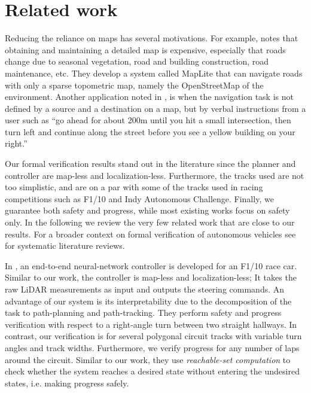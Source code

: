 \section{Related work}
\label{sec:relwork}
Reducing the reliance on maps has several motivations.
%
For example, \cite{Ort.2019} notes that 
obtaining and maintaining a detailed map is expensive, especially that roads change due to seasonal vegetation, road and building construction, road maintenance, etc.
%
They develop a system called MapLite that can navigate roads with only a sparse topometric map, namely the OpenStreetMap of the environment.
%
Another application noted in \cite{Vasudevan.2021}, \cite{Deruyttere.2019} is when the navigation task is not defined by a source and a destination on a map, but by verbal instructions from a user such as ``go ahead for about 200m until you hit a small intersection, then turn left and continue along the street before you see a yellow building on your right.''


Our formal verification results stand out in the literature since the planner and controller are map-less and localization-less.
%
Furthermore, the tracks used are not too simplistic, and are on a par with some of the tracks used in racing competitions such as F1/10 and Indy Autonomous Challenge.
%
Finally, we guarantee both safety and progress, while most existing works focus on safety only.
%
In the following we review the very few related work that are close to our results.
%
For a broader context on formal verification of autonomous vehicles see \cite{Rajabli.2020, Zhang.2020} for systematic literature reviews.


In \cite{Ivanov.2020, Ivanov-verifying.2020}, an end-to-end neural-network controller is developed for an F1/10 race car.
%
Similar to our work, the controller is map-less and localization-less;
%
It takes the raw LiDAR measurements as input and outputs the steering commands.
%
An advantage of our system is its interpretability due to the decomposition of the task to path-planning and path-tracking.
%
They perform safety and progress verification with respect to a right-angle turn between two straight hallways.
%
In contrast, our verification is for several polygonal circuit tracks with variable turn angles and track widths.
%
Furthermore, we verify progress for any number of laps around the circuit.
%
Similar to our work, they use \emph{reachable-set computation} to check whether the system reaches a desired state without entering the undesired states, i.e. making progress safely.



